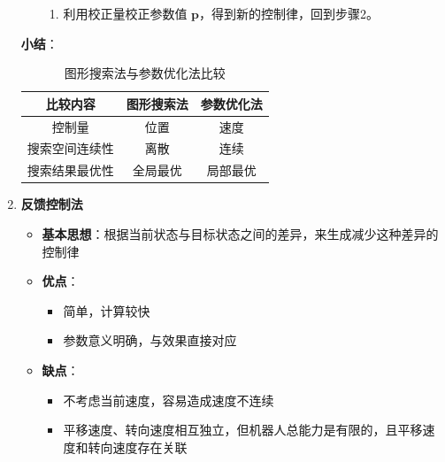 \documentclass[../main.tex]{subfiles}
\begin{document}
\begin{enumerate}
\begin{itemize}
{\begin{enumerate}
                        \item 利用校正量校正参数值 $\mathbf{p}$，得到新的控制律，回到步骤2。
                        
                    \end{enumerate}}

                        \end{itemize}
                    \textbf{小结}：
                    \begin{table}[htbp]
                        \centering
                        \caption{图形搜索法与参数优化法比较}
                        \begin{tabular}{ccc}
                        \toprule
                        \textbf{比较内容} & \textbf{图形搜索法} & \textbf{参数优化法} \\
                        \midrule
                        控制量 & 位置 & 速度 \\
                        搜索空间连续性 & 离散 & 连续 \\
                        搜索结果最优性 & 全局最优 & 局部最优 \\
                        \bottomrule
                        \end{tabular}
                    \end{table}
                    \item \textbf{反馈控制法}\label{method:feedback}
                        \begin{itemize}
                            \item \textbf{基本思想}：根据当前状态与目标状态之间的差异，来生成减少这种差异的控制律
                            \item \textbf{优点}：
                                \begin{itemize}
                                    \item 简单，计算较快
                                    \item 参数意义明确，与效果直接对应
                                \end{itemize}
                            \item \textbf{缺点}：
                                \begin{itemize}
                                    \item 不考虑当前速度，容易造成速度不连续
                                    \item 平移速度、转向速度相互独立，但机器人总能力是有限的，且平移速度和转向速度存在关联

\end{itemize}
\end{itemize}
\end{enumerate}
\end{document}
